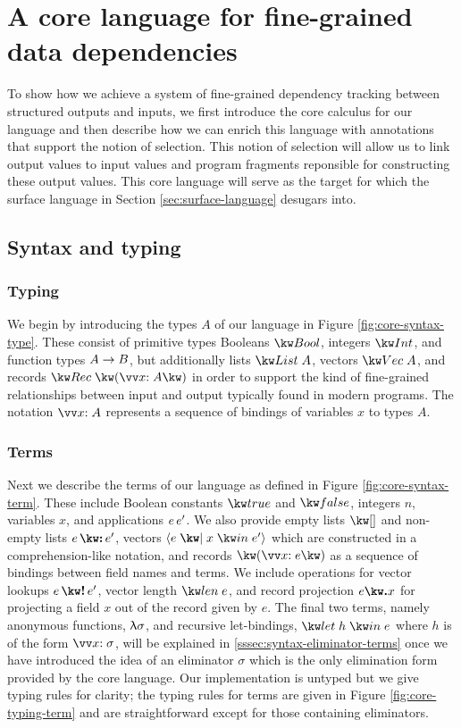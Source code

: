\newpage

\section{A core language for fine-grained data dependencies}
\label{sec:core-language}

To show how we achieve a system of fine-grained dependency tracking between structured outputs and inputs, we first introduce the core calculus for our language and then describe how we can enrich this language with annotations that support the notion of selection. This notion of selection will allow us to link output values to input values and program fragments reponsible for constructing these output values. This core language will serve as the target for which the surface language in Section \ref{sec:surface-language} desugars into.

\subsection{Syntax and typing}

\subsubsection{Typing}
We begin by introducing the types $A$ of our language in Figure \ref{fig:core-syntax-type}. These consist of primitive types Booleans $\tyBool$, integers $\tyInt$, and function types ${A}\rightarrow{B}$, but additionally lists $\tyList{A}$, vectors $\tyVec{A}$, and records $\tyRec{\vec{\bind{x}{A}}}$ in order to support the kind of fine-grained relationships between input and output typically found in modern programs. The notation $\seq{\bind{x}{A}}$ represents a sequence of bindings of variables $x$ to types $A$.



\subsubsection{Terms}
Next we describe the terms of our language as defined in Figure \ref{fig:core-syntax-term}.  These include Boolean constants $\exTrue$ and $\exFalse$, integers $n$, variables $x$, and applications ${e}\,{e'}$. We also provide empty lists $\exNil$ and non-empty lists $\exCons{e}{e'}$, vectors $\exVec{e}{x}{e'}$ which are constructed in a comprehension-like notation, and records $\exRec{\vec{\bind{x}{e}}}$ as a sequence of bindings between field names and terms. We include operations for vector lookups $\exVecLookup{e}{e'}$, vector length $\exVecLen{e}$, and record projection $\exRecProj{e}{x}$ for projecting a field $x$ out of the record given by $e$. The final two terms, namely anonymous functions, $\uplambda{\sigma}$, and recursive let-bindings, $\exLetRecMutual{h}{e}$ where $h$ is of the form $\vec{\bind{x}{\sigma}}$, will be explained in \ref{sssec:syntax-eliminator-terms} once we have introduced the idea of an eliminator $\sigma$ which is the only elimination form provided by the core language. Our implementation is untyped but we give typing rules for clarity; the typing rules for terms are given in Figure \ref{fig:core-typing-term} and are straightforward except for those containing eliminators.

